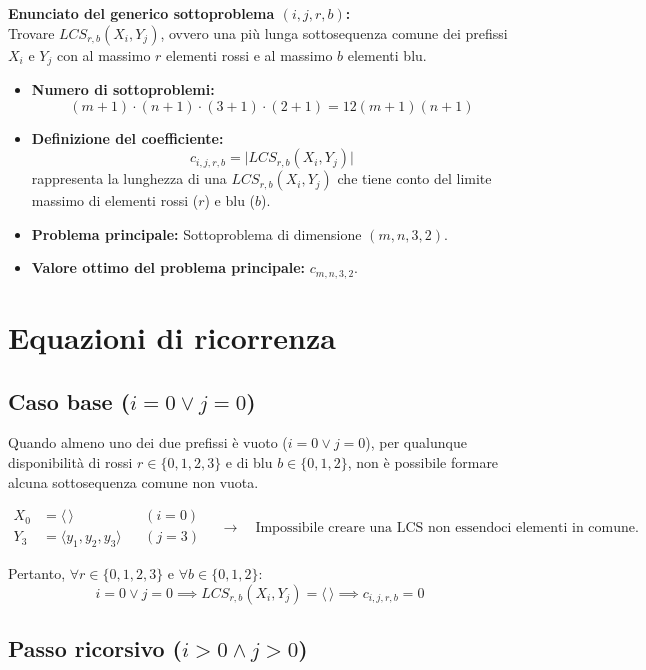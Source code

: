 \noindent
\textbf{Enunciato del generico sottoproblema $(i, j, r, b)$:} \\
Trovare $LCS_{r,b}(X_i, Y_j)$, ovvero una più lunga sottosequenza comune dei prefissi $X_i$ e $Y_j$ con al massimo $r$ elementi rossi e al massimo $b$ elementi blu.

\begin{itemize}
    \item \textbf{Numero di sottoproblemi:}
    \[
        (m + 1) \cdot (n + 1) \cdot (3 + 1) \cdot (2 + 1) = 12 (m + 1)(n + 1)
    \]
    \item \textbf{Definizione del coefficiente:}
    \[
        c_{i,j,r,b} = \big|LCS_{r,b}(X_i, Y_j)\big|
    \]
    rappresenta la lunghezza di una $LCS_{r,b}(X_i, Y_j)$ che tiene conto del limite massimo di elementi rossi ($r$) e blu ($b$).
    \item \textbf{Problema principale:} Sottoproblema di dimensione $(m, n, 3, 2)$.
    \item \textbf{Valore ottimo del problema principale:} $c_{m,n,3,2}$.
\end{itemize}

\section{Equazioni di ricorrenza}

\subsection{Caso base ($i = 0 \lor j = 0$)}

Quando almeno uno dei due prefissi è vuoto ($i = 0 \lor j = 0$), per qualunque disponibilità di rossi $r \in \{0, 1, 2, 3\}$ e di blu $b \in \{0, 1, 2\}$, non è possibile formare alcuna sottosequenza comune non vuota.

\[
\begin{aligned}
    X_0 &= \langle\,\rangle && (i = 0) \\
    Y_3 &= \langle y_1, y_2, y_3 \rangle && (j = 3)
\end{aligned}
\quad \longrightarrow \quad
\text{Impossibile creare una LCS non essendoci elementi in comune.}
\]

\noindent
Pertanto, $\forall r \in \{0, 1, 2, 3\}$ e $\forall b \in \{0, 1, 2\}$:
\[
    i = 0 \lor j = 0 \implies LCS_{r,b}(X_i, Y_j) = \langle\,\rangle \implies c_{i,j,r,b} = 0
\]

\subsection{Passo ricorsivo ($i > 0 \land j > 0$)}

